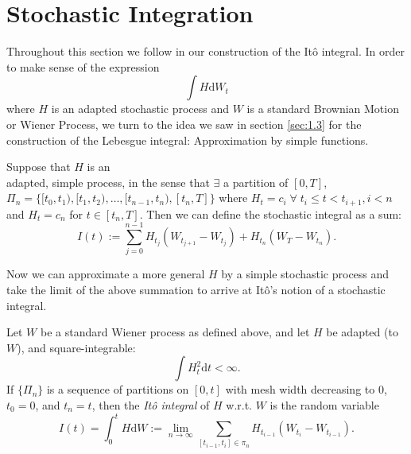 \section{Stochastic Integration}\label{sec:1.5}

Throughout this section we follow \textcite{SCfFII} in our construction of the It\^{o} 
integral. In order to make sense of the expression 
\begin{equation*}
    \int H\mathrm dW_t
\end{equation*}
where $H$ is an adapted stochastic process and $W$ is a standard Brownian Motion or 
Wiener Process, we turn to the idea we saw in section \ref{sec:1.3}
for the construction of the Lebesgue integral: Approximation by simple functions.

\begin{definition}
    Suppose that $H$ is an\\ adapted, simple process, in the sense that $\exists$ a 
    partition of $[0,T]$, \\$\Pi_n=\{[t_0,t_1),[t_1,t_2),\dots,[t_{n-1},t_n),[t_n,T]\}$ where 
    $H_t=c_i\;\forall\;t_i\leq t<t_{i+1}, i < n$ and $H_t=c_n$ for $t\in[t_n,T]$.
    Then we can define the stochastic integral as a sum:
    \begin{equation}
        I(t):=\sum_{j=0}^{n-1}H_{t_j}(W_{t_{j+1}}-W_{t_j})+H_{t_n}(W_T-W_{t_n}).
    \end{equation}     
\end{definition}

Now we can approximate a more general $H$ by a simple stochastic process and 
take the limit of the above summation to arrive at It\^{o}'s notion of a stochastic 
integral.

\begin{definition}
    Let $W$ be a standard Wiener process as defined above, and let $H$ be adapted 
    (to $W$), and square-integrable:
    \begin{equation*}
        \int H_t^2\mathrm dt<\infty.
    \end{equation*}
    If $\{\Pi_n\}$ is a sequence of partitions on $[0,t]$ with mesh width decreasing
    to $0$, $t_0=0$, and $t_n=t$, then the \emph{It\^{o} integral} of $H$
    w.r.t. $W$ is the random variable
    \begin{equation}
        I(t)=\int_0^tH\mathrm dW:=\lim_{n\rightarrow\infty}\sum_{[t_{i-1},t_i]\in\pi_n}H_{t_{i-1}}(W_{t_i}-W_{t_{i-1}}).
    \end{equation}
\end{definition}

